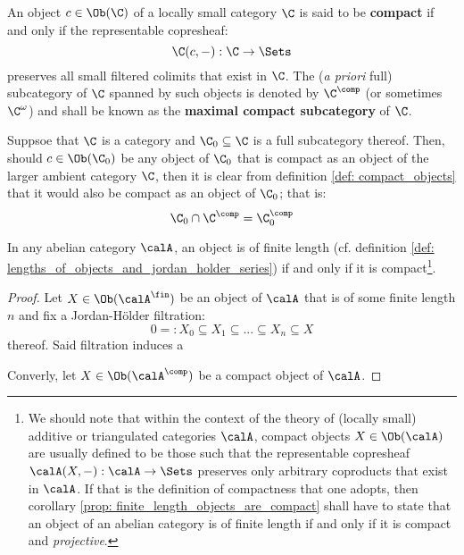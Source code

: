 \begin{definition} \label{def: compact_objects}
                An object $c \in \Ob(\C)$ of a locally small category $\C$ is said to be \textbf{compact} if and only if the representable copresheaf:
                    $$\C(c, -): \C \to \Sets$$
                preserves all small filtered colimits that exist in $\C$. The (\textit{a priori} full) subcategory of $\C$ spanned by such objects is denoted by $\C^{\comp}$ (or sometimes $\C^{\omega}$) and shall be known as the \textbf{maximal compact subcategory} of $\C$. 
            \end{definition}
            \begin{remark} \label{remark: compact_objects_in_full_subcategories}
                Suppsoe that $\C$ is a category and $\C_0 \subseteq \C$ is a full subcategory thereof. Then, should $c \in \Ob(\C_0)$ be any object of $\C_0$ that is compact as an object of the larger ambient category $\C$, then it is clear from definition \ref{def: compact_objects} that it would also be compact as an object of $\C_0$; that is:
                    $$\C_0 \cap \C^{\comp} = \C_0^{\comp}$$
            \end{remark}
            \begin{proposition} \label{prop: finite_length_objects_are_compact}
                In any abelian category $\calA$, an object is of finite length (cf. definition \ref{def: lengths_of_objects_and_jordan_holder_series}) if and only if it is compact\footnote{We should note that within the context of the theory of (locally small) additive or triangulated categories $\calA$, compact objects $X \in \Ob(\calA)$ are usually defined to be those such that the representable copresheaf $\calA(X, -): \calA \to \Sets$ preserves only arbitrary coproducts that exist in $\calA$. If that is the definition of compactness that one adopts, then corollary \ref{prop: finite_length_objects_are_compact} shall have to state that an object of an abelian category is of finite length if and only if it is compact and \textit{projective}.}. 
            \end{proposition}
                \begin{proof}
                    Let $X \in \Ob(\calA^{\fin})$ be an object of $\calA$ that is of some finite length $n$ and fix a Jordan-H\"older filtration:
                        $$0 =: X_0 \subseteq X_1 \subseteq ... \subseteq X_n \subseteq X$$
                    thereof. Said filtration induces a 
                    
                    Converly, let $X \in \Ob(\calA^{\comp})$ be a compact object of $\calA$. 
                \end{proof}
